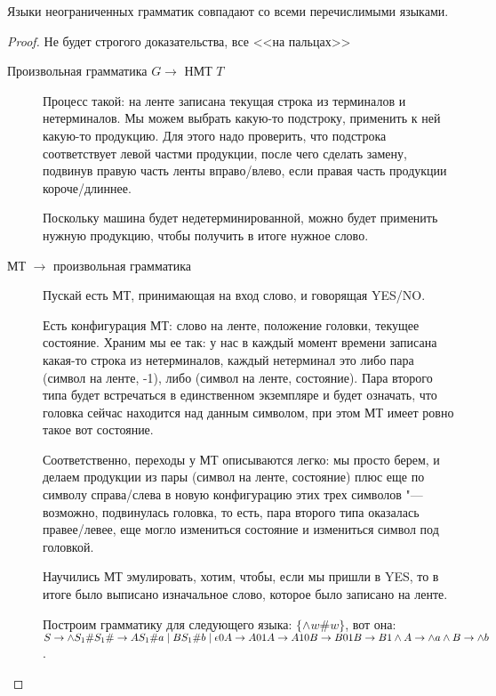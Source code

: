 \begin{theorem}
Языки неограниченных грамматик совпадают со всеми перечислимыми языками.
\end{theorem}
\begin{proof}
Не будет строгого доказательства, все <<на пальцах>>
\begin{description}
\item[Произвольная грамматика $G \to$ НМТ $T$]
Процесс такой: на ленте записана текущая строка из терминалов и нетерминалов. Мы можем выбрать какую-то подстроку, применить к ней какую-то продукцию.
Для этого надо проверить, что подстрока соответствует левой частми продукции, после чего сделать замену, подвинув правую часть ленты вправо/влево, если правая часть продукции короче/длиннее.

Поскольку машина будет недетерминированной, можно будет применить нужную продукцию, чтобы получить в итоге нужное слово.

\item[МТ $\to$ произвольная грамматика]
Пускай есть МТ, принимающая на вход слово, и говорящая YES/NO. 

Есть конфигурация МТ: слово на ленте, положение головки, текущее состояние. 
Храним мы ее так: у нас в каждый момент времени записана какая-то строка из нетерминалов, каждый нетерминал это либо пара (символ на ленте, -1), либо (символ на ленте, состояние).
Пара второго типа будет встречаться в единственном экземпляре и будет означать, что головка сейчас находится над данным символом, при этом МТ имеет ровно такое вот состояние.

Соответственно, переходы у МТ описываются легко: мы просто берем, и делаем продукции из пары (символ на ленте, состояние) плюс еще по символу справа/слева в новую конфигурацию этих трех символов "---
возможно, подвинулась головка, то есть, пара второго типа оказалась правее/левее, еще могло измениться состояние и измениться символ под головкой.

Научились МТ эмулировать, хотим, чтобы, если мы пришли в YES, то в итоге было выписано изначальное слово, которое было записано на ленте.
                                                
Построим грамматику для следующего языка: $\{\wedge w\#w\}$, вот она:
$\\
S \to \wedge S_1\# \\
S_1\# \to AS_1\#a \mid BS_1\#b \mid \epsilon \\
0A \to A0 \\
1A \to A1 \\
0B \to B0 \\
1B \to B1 \\
\wedge A \to \wedge a \\
\wedge B \to \wedge b$.


\end{description}
\end{proof}
